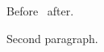 \documentclass{article}
\begin{document}
Before \the\lxrgf\ after.

Second paragraph.
\end{document}
